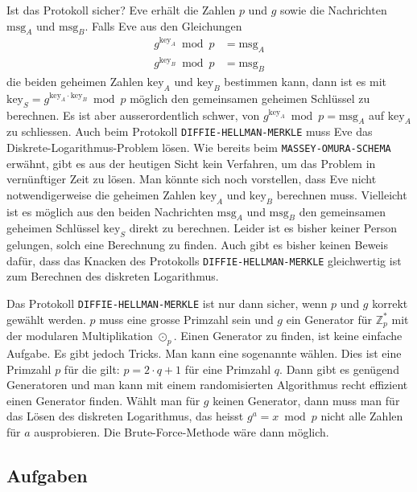 Ist das Protokoll sicher? Eve erhält die Zahlen $p$ und $g$ sowie die Nachrichten $\text{msg}_A$ und $\text{msg}_B$. Falls Eve aus den Gleichungen
\begin{align*}
	g^{\text{key}_A} \bmod p & = \text{msg}_A \\
	g^{\text{key}_B} \bmod p & = \text{msg}_B
\end{align*}
die beiden geheimen Zahlen $\text{key}_A$ und $\text{key}_B$ bestimmen kann, dann ist es mit $\text{key}_S = g^{\text{key}_A \cdot \text{key}_B} \bmod p$ möglich den gemeinsamen geheimen Schlüssel zu berechnen. Es ist aber ausserordentlich schwer, von $g^{\text{key}_A} \bmod p = \text{msg}_A$ auf $\text{key}_A$ zu schliessen. Auch beim Protokoll \texttt{DIFFIE-HELLMAN-MERKLE} muss Eve das Diskrete-Logarithmus-Problem lösen. Wie bereits beim \texttt{MASSEY-OMURA-SCHEMA} erwähnt, gibt es aus der heutigen Sicht kein Verfahren, um das Problem in vernünftiger Zeit zu lösen. Man könnte sich noch vorstellen, dass Eve nicht notwendigerweise die geheimen Zahlen $\text{key}_A$ und $\text{key}_B$ berechnen muss. Vielleicht ist es möglich aus den beiden Nachrichten $\text{msg}_A$ und $\text{msg}_B$ den gemeinsamen geheimen Schlüssel $\text{key}_S$ direkt zu berechnen. Leider ist es bisher keiner Person gelungen, solch eine Berechnung zu finden. Auch gibt es bisher keinen Beweis dafür, dass das Knacken des Protokolls \texttt{DIFFIE-HELLMAN-MERKLE} gleichwertig ist zum Berechnen des diskreten Logarithmus.

\begin{important}
	Das Protokoll \texttt{DIFFIE-HELLMAN-MERKLE} ist nur dann sicher, wenn $p$ und $g$ korrekt gewählt werden. $p$ muss eine grosse Primzahl sein und $g$ ein Generator für $\mathbb{Z}_{p}^*$ mit der modularen Multiplikation $\odot_{p}$. Einen Generator zu finden, ist keine einfache Aufgabe. Es gibt jedoch Tricks. Man kann eine sogenannte  wählen. Dies ist eine Primzahl $p$ für die gilt: $p = 2 \cdot q + 1$ für eine Primzahl $q$. Dann gibt es genügend Generatoren und man kann mit einem randomisierten Algorithmus recht effizient einen Generator finden. Wählt man für $g$ keinen Generator, dann muss man für das Lösen des diskreten Logarithmus, das heisst $g^a = x \bmod p$ nicht alle Zahlen für $a$ ausprobieren. Die Brute-Force-Methode wäre dann möglich.
\end{important}

\subsection{Aufgaben}

